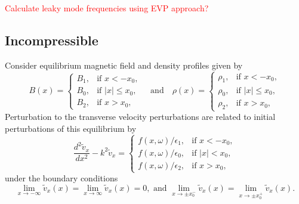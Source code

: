 \documentclass[12pt]{../style-files/ociamthesis}
\begin{document}
\textcolor{red}{Calculate leaky mode frequencies using EVP approach?}

\subsection{Incompressible}

Consider equilibrium magnetic field and density profiles given by
\begin{equation}
B(x)=
\begin{cases}
B_1, & \text{if  }x<-x_0, \\
B_0, & \text{if }|x|\leq{x_0}, \\
B_2, & \text{if  }x>x_0,
\end{cases}
\quad \text{and} \quad
\rho(x)=
\begin{cases}
\rho_1, & \text{if  }x<-x_0, \\
\rho_0, & \text{if }|x|\leq{x_0}, \\
\rho_2, & \text{if  }x>x_0,
\end{cases}
\end{equation}
Perturbation to the transverse velocity perturbations are related to initial perturbations of this equilibrium by
\begin{equation}
\frac{d^2\tilde{v}_x}{dx^2} - k^2\tilde{v}_x = 
\begin{cases}
f(x, \omega)/\epsilon_1, & \text{if  } x<-x_0,\\
f(x, \omega)/\epsilon_0, & \text{if  } |x|<x_0,\\
f(x, \omega)/\epsilon_2, & \text{if  } x>x_0,
\end{cases}
\label{ivp gov slab 2}
\end{equation}
under the boundary conditions
\begin{equation}
\lim_{x \to -\infty}\tilde{v}_x(x) = \lim_{x \to \infty}\tilde{v}_x(x) = 0, \text{ and } \lim_{x \to \pm x_0^-}\tilde{v}_x(x) = \lim_{x \to \pm x_0^+}\tilde{v}_x(x).
\label{ivp slab BC}
\end{equation}
\end{document}
